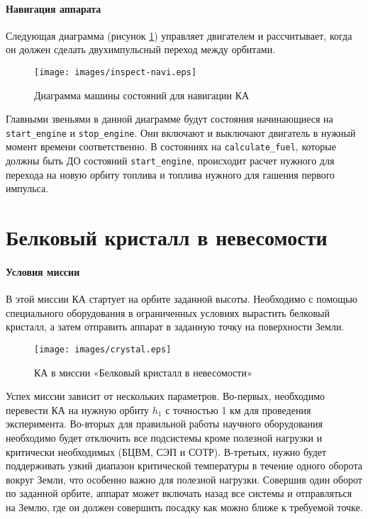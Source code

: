 \documentclass[12pt,a4paper]{article}
\begin{document}
\clearpage

\paragraph{Навигация аппарата} Следующая диаграмма (рисунок \ref{Pic:INSPECT-navi}) управляет двигателем и рассчитывает, когда он должен сделать двухимпульсный переход между орбитами.

\begin{figure}[tbh]
  \begin{center}
    \texttt{[image: images/inspect-navi.eps]}
    \caption{Диаграмма машины состояний для навигации КА}
    \label{Pic:INSPECT-navi}
  \end{center}
\end{figure}

Главными звеньями в данной диаграмме будут состояния начинающиеся на \verb'start_engine' и \verb'stop_engine'. Они включают и выключают двигатель в нужный момент времени соответственно. В состояниях на  \verb'calculate_fuel', которые должны быть ДО состояний \verb'start_engine', происходит расчет нужного для перехода на новую орбиту топлива и топлива нужного для гашения первого импульса.

\section{Белковый кристалл в невесомости}

\paragraph{Условия миссии} В этой миссии КА стартует на орбите
заданной высоты. Необходимо с помощью специального оборудования в ограниченных условиях вырастить белковый кристалл, а затем отправить аппарат в заданную точку на поверхности Земли.

\begin{figure}[tbh]
  \begin{center}
    \texttt{[image: images/crystal.eps]}
    \caption{КА в миссии «Белковый кристалл в невесомости»}
    \label{Pic:Crystal}
  \end{center}
\end{figure}

Успех миссии зависит от нескольких параметров. Во-первых, необходимо перевести КА на нужную орбиту $h_1$ с точностью 1 км для проведения эксперимента. Во-вторых для правильной работы научного оборудования необходимо будет отключить все подсистемы кроме полезной нагрузки и критически необходимых (БЦВМ, СЭП и СОТР). В-третьих, нужно будет поддерживать узкий диапазон критической температуры в течение одного оборота вокруг Земли, что особенно важно для полезной нагрузки. Совершив один оборот по заданной орбите, аппарат может включать назад все системы и отправляться на Землю, где он должен совершить посадку как можно ближе к требуемой точке.
\end{document}
